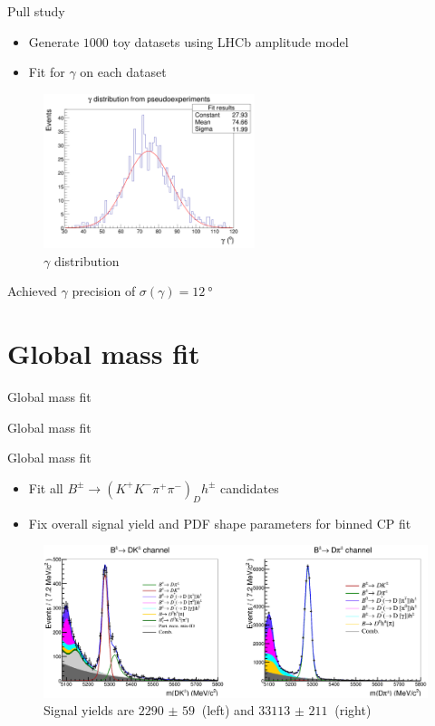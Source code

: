 \documentclass{beamer}
\begin{document}
\begin{frame}{Pull study}
  \begin{itemize}
    \item{Generate $1000$ toy datasets using LHCb amplitude model}
    \item{Fit for $\gamma$ on each dataset}
  \end{itemize}
  \begin{figure}
    \centering
    \includegraphics[width = 0.55\textwidth]{../Report/Plots/GammaDistribution8BinsVariableWidth.png}
    \caption{$\gamma$ distribution}
  \end{figure}
  \vspace{-0.5cm}
  \begin{center}
    Achieved $\gamma$ precision of $\sigma(\gamma) = \SI{12}{\degree}$
  \end{center}
\end{frame}

\section{Global mass fit}
\begin{frame}{Global mass fit}
  \begin{center}
    {\huge Global mass fit} \\
  \end{center}
\end{frame}

\begin{frame}{Global mass fit}
  \begin{itemize}
    \setlength\itemsep{1.3em}
    \item{Fit all $B^\pm\to(K^+K^-\pi^+\pi^-)_Dh^\pm$ candidates}
    \item{Fix overall signal yield and PDF shape parameters for binned CP fit}
  \end{itemize}
  \begin{figure}
    \centering
    \includegraphics[width = 1.0\textwidth]{../Report/Plots/GlobalFit.png}
    \caption{Signal yields are $\SI{2290(59)}{}$ (left) and $\SI{33113(211)}{}$ (right)}
  \end{figure}
\end{frame}
\end{document}
